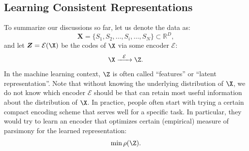 \documentclass[../../book-main.tex]{subfiles}
\begin{document}








\subsection{Learning Consistent Representations}

\label{sec:consistency}
To summarize our discussions so far, let us denote the data as:
\begin{equation}
    \boldsymbol{X} = \{S_1, S_2, \ldots, S_i, \ldots, S_N\} \subset \mathbb{R}^D,
\end{equation}
and let $\boldsymbol{Z} = \mathcal{E}(\X)$ be the codes of $\X$ via some encoder $\mathcal{E}$:
\begin{equation}
    \X  \xrightarrow{\hspace{2mm} \mathcal{E}\hspace{2mm}} \Z.
    \label{eqn:open-loop}
\end{equation}
In the machine learning context, $\Z$ is often called ``features'' or ``latent representation''. Note that without knowing the underlying distribution of $\X$, we do not know which encoder $\mathcal{E}$ should be that can retain most useful information about the distribution of $\X$. In practice, people often start with trying a certain compact encoding scheme that serves well for a specific task. In particular, they would try to learn an encoder that optimizes certain (empirical) measure of parsimony for the learned representation:
\begin{equation}
    \min \rho(\Z). 
\end{equation}
\end{document}
